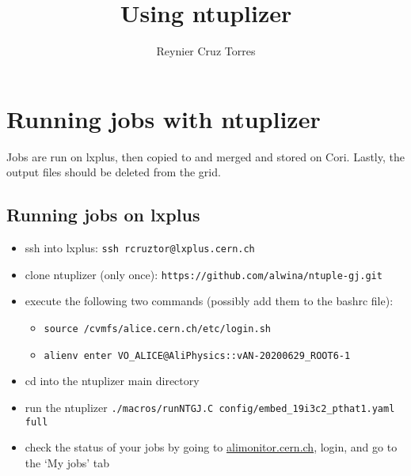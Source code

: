 \documentclass[12pt]{article}
\title{Using ntuplizer}
\author{Reynier Cruz Torres}
\begin{document}
\maketitle

\tableofcontents

\newpage

\section{Running jobs with ntuplizer}

Jobs are run on lxplus, then copied to and merged and stored on Cori. Lastly, the output files should be deleted from the grid.

\subsection{Running jobs on lxplus}

\begin{itemize}
\item ssh into lxplus: \verb|ssh rcruztor@lxplus.cern.ch|

\color{red}
\item clone ntuplizer (only once): \verb|https://github.com/alwina/ntuple-gj.git|
\color{black}

\item execute the following two commands (possibly add them to the bashrc file):

\begin{itemize}
\item \verb|source /cvmfs/alice.cern.ch/etc/login.sh|
\item \verb|alienv enter VO_ALICE@AliPhysics::vAN-20200629_ROOT6-1|
\end{itemize}

\item cd into the ntuplizer main directory

\item run the ntuplizer \verb|./macros/runNTGJ.C config/embed_19i3c2_pthat1.yaml full|

\item check the status of your jobs by going to \href{https://alimonitor.cern.ch/}{alimonitor.cern.ch}, login, and go to the `My jobs' tab

\end{itemize}
\end{document}
